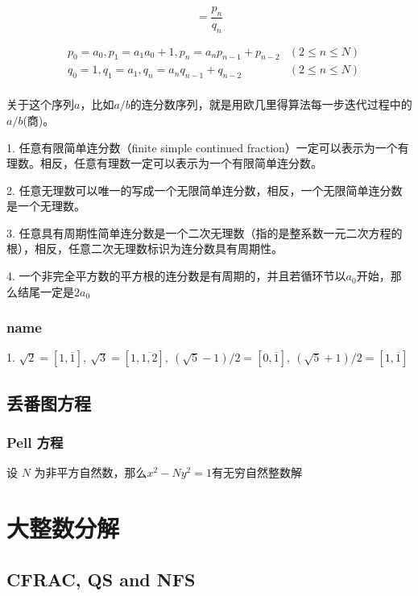 \documentclass{article}
\begin{document}
\begin{equation}
    [a_0,a_1,\cdots,a_n]=\frac{p_n}{q_n}
\end{equation}

\begin{equation}
    \begin{aligned}
    &p_0=a_0, p_1=a_1a_0+1,
    p_n=a_np_{n-1}+p_{n-2} &(2\le n\le N)\\
    &q_0=1,q_1=a_1,
    q_n=a_nq_{n-1}+q_{n-2} &(2\le n\le N)\\
    \end{aligned}
    \nonumber
\end{equation}


关于这个序列$a$，比如$a/b$的连分数序列，就是用欧几里得算法每一步迭代过程中的$a/b$(商)。

1. 任意有限简单连分数（finite simple continued fraction）一定可以表示为一个有理数。相反，任意有理数一定可以表示为一个有限简单连分数。

2. 任意无理数可以唯一的写成一个无限简单连分数，相反，一个无限简单连分数是一个无理数。

3. 任意具有周期性简单连分数是一个二次无理数（指的是整系数一元二次方程的根），相反，任意二次无理数标识为连分数具有周期性。

4. 一个非完全平方数的平方根的连分数是有周期的，并且若循环节以$a_0$开始，那么结尾一定是$2a_0$

\subsubsection{name}

1. $\sqrt{2}=[1,\overline{1}],~\sqrt{3}=[1,\overline{1,2}],~(\sqrt{5}-1)/2=[0,\overline{1}],~(\sqrt{5}+1)/2=[1,\overline{1}]$ 

\subsection{丢番图方程}

\subsubsection{Pell 方程}

设 $N$ 为非平方自然数，那么$x^2-Ny^2=1$有无穷自然整数解

\section{大整数分解}

\subsection{CFRAC, QS and NFS}
\end{document}
